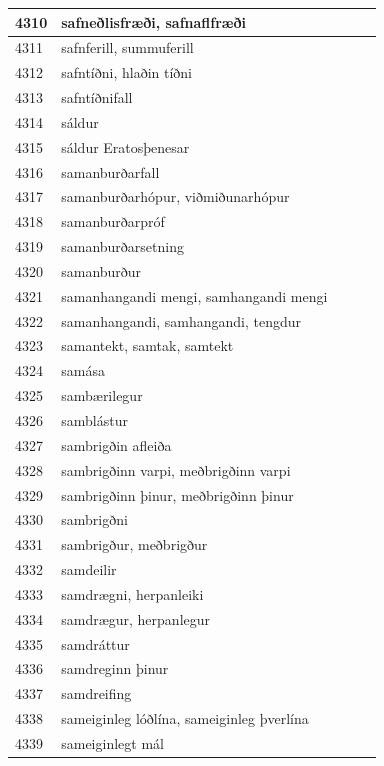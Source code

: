 \begin{longtable}{p{}|p{}|p{}|p{}|p{}}
\hline
4310 & safneðlisfræði, safnaflfræði &  &  &  \\
\hline
4311 & safnferill, summuferill &  &  &  \\
\hline
4312 & safntíðni, hlaðin tíðni &  &  &  \\
\hline
4313 & safntíðnifall &  &  &  \\
\hline
4314 & sáldur &  &  &  \\
\hline
4315 & sáldur Eratosþenesar &  &  &  \\
\hline
4316 & samanburðarfall &  &  &  \\
\hline
4317 & samanburðarhópur, viðmiðunarhópur &  &  &  \\
\hline
4318 & samanburðarpróf &  &  &  \\
\hline
4319 & samanburðarsetning &  &  &  \\
\hline
4320 & samanburður &  &  &  \\
\hline
4321 & samanhangandi mengi, samhangandi mengi &  &  &  \\
\hline
4322 & samanhangandi, samhangandi, tengdur &  &  &  \\
\hline
4323 & samantekt, samtak, samtekt &  &  &  \\
\hline
4324 & samása &  &  &  \\
\hline
4325 & sambærilegur &  &  &  \\
\hline
4326 & samblástur &  &  &  \\
\hline
4327 & sambrigðin afleiða &  &  &  \\
\hline
4328 & sambrigðinn varpi, meðbrigðinn varpi &  &  &  \\
\hline
4329 & sambrigðinn þinur, meðbrigðinn þinur &  &  &  \\
\hline
4330 & sambrigðni &  &  &  \\
\hline
4331 & sambrigður, meðbrigður &  &  &  \\
\hline
4332 & samdeilir &  &  &  \\
\hline
4333 & samdrægni, herpanleiki &  &  &  \\
\hline
4334 & samdrægur, herpanlegur &  &  &  \\
\hline
4335 & samdráttur &  &  &  \\
\hline
4336 & samdreginn þinur &  &  &  \\
\hline
4337 & samdreifing &  &  &  \\
\hline
4338 & sameiginleg lóðlína, sameiginleg þverlína &  &  &  \\
\hline
4339 & sameiginlegt mál &  &  &  \\

\end{longtable}

